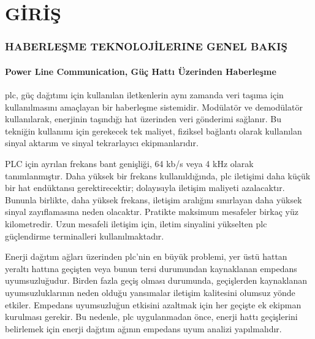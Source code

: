 
\part{GİRİŞ}
\thispagestyle{empty}
\newpage
\section{HABERLEŞME TEKNOLOJİLERINE GENEL BAKIŞ} \label{girisHaberlesme}
\subsection{Power Line Communication, Güç Hattı Üzerinden Haberleşme}


\gls{plc}, güç dağıtımı için kullanılan iletkenlerin aynı zamanda veri taşıma için kullanılmasını amaçlayan bir haberleşme sistemidir. Modülatör ve demodülatör kullanılarak, enerjinin taşındığı hat üzerinden veri gönderimi sağlanır. Bu tekniğin kullanımı için gerekecek tek maliyet, fiziksel bağlantı olarak kullanılan sinyal aktarım ve sinyal tekrarlayıcı ekipmanlarıdır.

PLC için ayrılan frekans bant genişliği, 64 kb/s veya 4 kHz olarak tanımlanmıştır. Daha yüksek bir frekans kullanıldığında, \gls{plc} iletişimi daha küçük bir hat endüktansı gerektirecektir; dolayısıyla iletişim maliyeti azalacaktır. Bununla birlikte, daha yüksek frekans, iletişim aralığını sınırlayan daha yüksek sinyal zayıflamasına neden olacaktır. Pratikte maksimum mesafeler birkaç yüz kilometredir. Uzun mesafeli iletişim için, iletim sinyalini yükselten \gls{plc} güçlendirme terminalleri kullanılmaktadır.

Enerji dağıtım ağları üzerinden \gls{plc}'nin en büyük problemi, yer üstü hattan yeraltı hattına geçişten veya bunun tersi durumundan kaynaklanan empedans uyumsuzluğudur. Birden fazla geçiş olması durumunda, geçişlerden kaynaklanan uyumsuzluklarının neden olduğu yansımalar iletişim kalitesini olumsuz yönde etkiler. Empedans uyumsuzluğun etkisini azaltmak için her geçişte ek ekipman kurulması gerekir. Bu nedenle, \gls{plc} uygulanmadan önce, enerji hattı geçişlerini belirlemek için enerji dağıtım ağının empedans uyum analizi yapılmalıdır\cite{duluau2015scada}.
\begin{comment}
\subsection{Radyo Dalgası}
Özellikle yenilenebilir enerji santrallerinin dağıtık kurulumundan kaynaklı, üre-tilen enerjinin merkeziyetçil kontrolü için bakır tel veya fiber optik kullanımı, kabloları döşemek ve güzergah için yapılacak altyapı işleri yüksek maliyetler gerektirmektedir. Radyo iletişimi kablolu haberleşme sistemlerinin getirmiş olduğu bant genişliğinin yerini almasa da radyo ağlarının güvenilirliği, performansı ve işletme maliyetleri son yıllarda önemli ölçüde artmıştır. Bu gelişmelerde kaynaklı olarak dağıtık enerji sistemlerinde tercih edilen bir haberleşme teknolojisidir\cite{bai2020radio}.
\end{comment}

